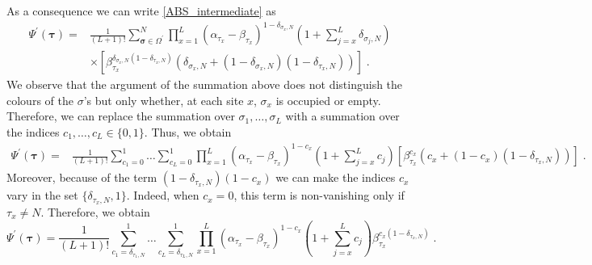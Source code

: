 \documentclass[10pt]{article}
\numberwithin{equation}{section}
\numberwithin{equation}{subsection}
\newcommand{\dt}{\;.}
\begin{document}
As a consequence we can write \eqref{ABS_intermediate} as 
\begin{align}
\Psi^{'}(\bm{\tau})%
=&\frac{1}{(L+1)!}\sum_{\bm{\sigma}\in \Omega^{'}}^{N}\prod_{x=1}^{L}\left(\alpha_{\tau_{x}}-\beta_{\tau_{x}}\right)^{1-\delta_{\sigma_{x},N}}\left(1+\sum_{j=x}^{L}\delta_{\sigma_{j},N}\right)\nonumber\\&\times\left[\beta_{\tau_{x}}^{\delta_{\sigma_{x},N}(1-\delta_{\tau_{x},N})}\left(\delta_{\sigma_{x},N}+(1-\delta_{\sigma_{x},N})(1-\delta_{\tau_{x},N})\right)\right]\dt
\end{align}
We observe that the argument of the summation above does not distinguish the colours of the $\sigma$'s but only whether, at each site $x$, $\sigma_{x}$ is occupied or empty. Therefore, we can replace the summation over $\sigma_{1},\ldots,\sigma_{L}$ with a summation over the indices  $c_{1},\ldots,c_{L}\in \{0,1\}$. Thus, we obtain 
\begin{align}
\Psi^{'}(\bm{\tau})	=&\frac{1}{(L+1)!}\sum_{c_{1}=0}^{1}\ldots\sum_{c_{L}=0}^{1}\prod_{x=1}^{L}\left(\alpha_{\tau_{x}}-\beta_{\tau_{x}}\right)^{1-c_{x}}\left(1+\sum_{j=x}^{L}c_{j}\right)\left[\beta_{\tau_{x}}^{c_{x}}\left(c_{x}+(1-c_{x})(1-\delta_{\tau_{x},N})\right)\right]\dt
\end{align}
Moreover, because of the term $(1-\delta_{\tau_{x},N})(1-c_{x})$ we can make the indices $c_{x}$ vary in the set $\{\delta_{\tau_{x},N},1\}$. Indeed, when $c_{x}=0$, this term is non-vanishing only if $\tau_{x}\neq N$. Therefore, we obtain 
\begin{equation}
	\Psi^{'}(\bm{\tau})=\frac{1}{(L+1)!}\sum_{c_{1}=\delta_{\tau_{1},N}}^{1}\ldots\sum_{c_{L}=\delta_{\tau_{L},N}}^{1}\prod_{x=1}^{L}\left(\alpha_{\tau_{x}}-\beta_{\tau_{x}}\right)^{1-c_{x}}\left(1+\sum_{j=x}^{L}c_{j}\right)\beta_{\tau_{x}}^{c_{x}(1-\delta_{\tau_{x},N})}\dt
\end{equation}
\end{document}
